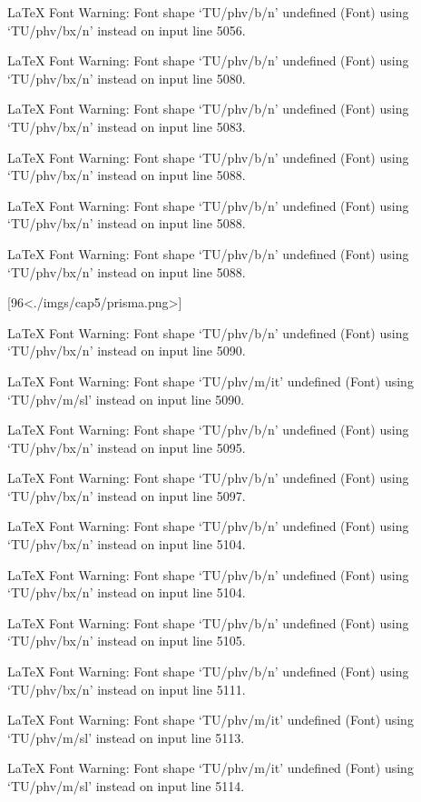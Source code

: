 LaTeX Font Warning: Font shape `TU/phv/b/n' undefined
(Font)              using `TU/phv/bx/n' instead on input line 5056.


LaTeX Font Warning: Font shape `TU/phv/b/n' undefined
(Font)              using `TU/phv/bx/n' instead on input line 5080.


LaTeX Font Warning: Font shape `TU/phv/b/n' undefined
(Font)              using `TU/phv/bx/n' instead on input line 5083.


LaTeX Font Warning: Font shape `TU/phv/b/n' undefined
(Font)              using `TU/phv/bx/n' instead on input line 5088.


LaTeX Font Warning: Font shape `TU/phv/b/n' undefined
(Font)              using `TU/phv/bx/n' instead on input line 5088.


LaTeX Font Warning: Font shape `TU/phv/b/n' undefined
(Font)              using `TU/phv/bx/n' instead on input line 5088.

[96<./imgs/cap5/prisma.png>]

LaTeX Font Warning: Font shape `TU/phv/b/n' undefined
(Font)              using `TU/phv/bx/n' instead on input line 5090.


LaTeX Font Warning: Font shape `TU/phv/m/it' undefined
(Font)              using `TU/phv/m/sl' instead on input line 5090.


LaTeX Font Warning: Font shape `TU/phv/b/n' undefined
(Font)              using `TU/phv/bx/n' instead on input line 5095.


LaTeX Font Warning: Font shape `TU/phv/b/n' undefined
(Font)              using `TU/phv/bx/n' instead on input line 5097.


LaTeX Font Warning: Font shape `TU/phv/b/n' undefined
(Font)              using `TU/phv/bx/n' instead on input line 5104.


LaTeX Font Warning: Font shape `TU/phv/b/n' undefined
(Font)              using `TU/phv/bx/n' instead on input line 5104.


LaTeX Font Warning: Font shape `TU/phv/b/n' undefined
(Font)              using `TU/phv/bx/n' instead on input line 5105.


LaTeX Font Warning: Font shape `TU/phv/b/n' undefined
(Font)              using `TU/phv/bx/n' instead on input line 5111.


LaTeX Font Warning: Font shape `TU/phv/m/it' undefined
(Font)              using `TU/phv/m/sl' instead on input line 5113.


LaTeX Font Warning: Font shape `TU/phv/m/it' undefined
(Font)              using `TU/phv/m/sl' instead on input line 5114.


